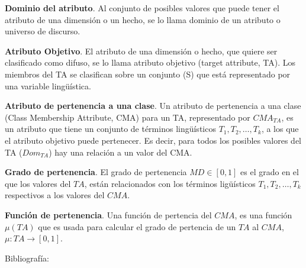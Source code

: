 \documentclass{fancyslides}
\begin{document}
\begin{frame}
\misc
{
\textbf{Dominio del atributo}. Al conjunto de posibles valores que puede tener el atributo de una dimensión o un hecho, se lo llama dominio de un atributo o universo de discurso.

\textbf{Atributo Objetivo}.  El atributo de una dimensión o hecho, que quiere ser clasificado como difuso, se lo llama atributo objetivo (target attribute, TA). Los miembros del TA se clasifican sobre un conjunto (S) que está representado por una variable lingüística.

\textbf{Atributo de pertenencia a una clase}. Un atributo de pertenencia a una clase (Class Membership Attribute, CMA) para un TA, representado por $CMA_{TA}$, es un
atributo que tiene un conjunto de términos lingüísticos $T_{1},T_{2}, \ldots , T_{k}$, a los que el atributo objetivo puede pertenecer. Es decir, para todos los
posibles valores del TA ($Dom_{TA}$) hay una relación a un valor del CMA.
}
\end{frame}


\begin{frame}
\misc
{
\textbf{Grado de pertenencia}. El grado de pertenencia $MD \in [0,1]$ es el grado en el que los valores del $TA$, están relacionados con los términos
ligüísticos $T_{1},T_{2}, \ldots , T_{k}$ respectivos a los valores del $CMA$.

\textbf{Función de pertenencia}. Una función de pertencia del $CMA$, es una función $\mu (TA)$ que es usada para calcular el grado de pertencia de un
$TA$ al $CMA$, $\mu : TA \rightarrow [0,1]$.
}
\end{frame}


\begin{frame}
\misc
{ Bibliografía:

\printbibliography

}
\end{frame}
\end{document}
